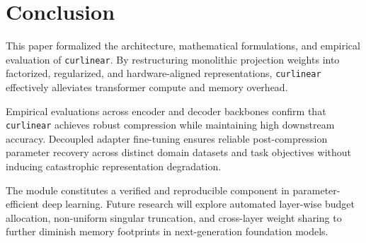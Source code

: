 \section{Conclusion}
This paper formalized the architecture, mathematical formulations, and empirical evaluation of \texttt{curlinear}. By restructuring monolithic projection weights into factorized, regularized, and hardware-aligned representations, \texttt{curlinear} effectively alleviates transformer compute and memory overhead.

Empirical evaluations across encoder and decoder backbones confirm that \texttt{curlinear} achieves robust compression while maintaining high downstream accuracy. Decoupled adapter fine-tuning ensures reliable post-compression parameter recovery across distinct domain datasets and task objectives without inducing catastrophic representation degradation.

The module constitutes a verified and reproducible component in parameter-efficient deep learning. Future research will explore automated layer-wise budget allocation, non-uniform singular truncation, and cross-layer weight sharing to further diminish memory footprints in next-generation foundation models.
